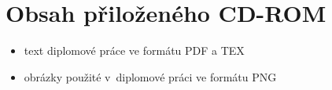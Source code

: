 \chapter{Obsah přiloženého CD-ROM} \label{kap:Obsah_CD}
\begin{itemize}
\item text diplomové práce ve formátu PDF a TEX
\item obrázky použité v~diplomové práci ve formátu PNG
\end{itemize}